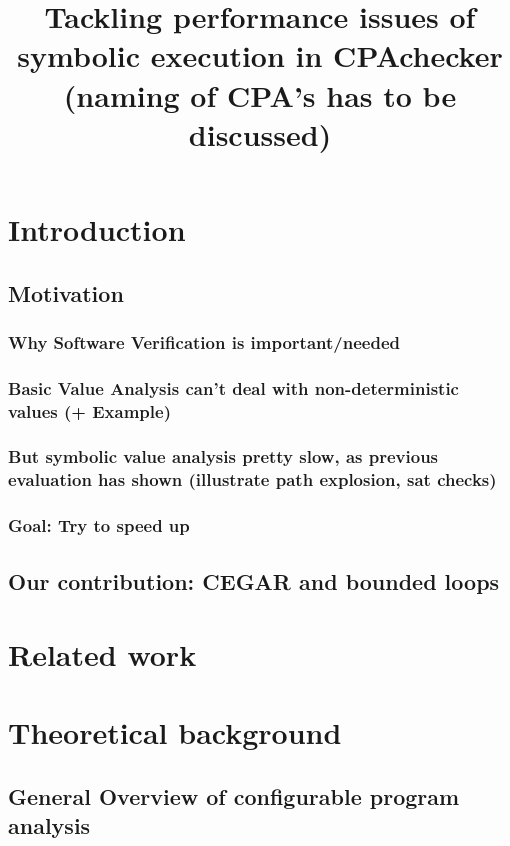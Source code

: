 \documentclass[a4paper,11pt]{article}
\begin{document}
\title{Tackling performance issues of symbolic execution in CPAchecker (naming of CPA's has to be discussed)}
\maketitle
\setcounter{tocdepth}{5}
\setcounter{secnumdepth}{5}
\tableofcontents

\section{Introduction}
\subsection{Motivation}
\subsubsection{Why Software Verification is important/needed}
\subsubsection{Basic Value Analysis can't deal with non-deterministic values (+ Example)}
\subsubsection{But symbolic value analysis pretty slow, as previous evaluation has shown (illustrate path explosion, sat checks)}
\subsubsection{Goal: Try to speed up}
\subsection{Our contribution: CEGAR and bounded loops}

\section{Related work}

\section{Theoretical background}
\subsection{General Overview of configurable program analysis}
\end{document}
